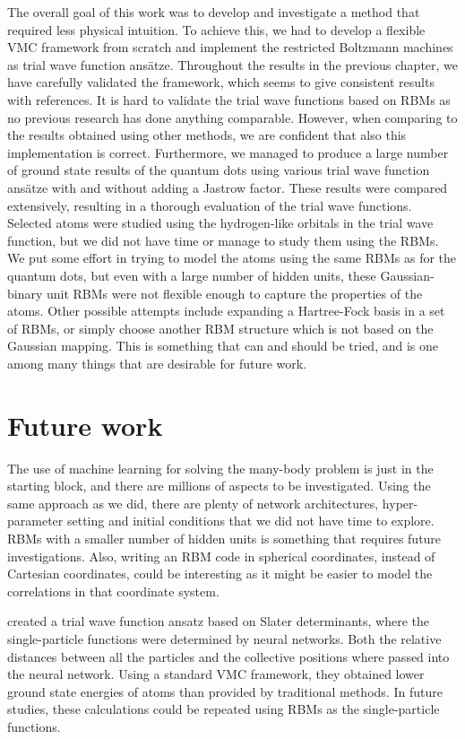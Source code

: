 The overall goal of this work was to develop and investigate a method that required less physical intuition. To achieve this, we had to develop a flexible VMC framework from scratch and implement the restricted Boltzmann machines as trial wave function ansätze. Throughout the results in the previous chapter, we have carefully validated the framework, which seems to give consistent results with references. It is hard to validate the trial wave functions based on RBMs as no previous research has done anything comparable. However, when comparing to the results obtained using other methods, we are confident that also this implementation is correct. Furthermore, we managed to produce a large number of ground state results of the quantum dots using various trial wave function ansätze with and without adding a Jastrow factor. These results were compared extensively, resulting in a thorough evaluation of the trial wave functions. Selected atoms were studied using the hydrogen-like orbitals in the trial wave function, but we did not have time or manage to study them using the RBMs. We put some effort in trying to model the atoms using the same RBMs as for the quantum dots, but even with a large number of hidden units, these Gaussian-binary unit RBMs were not flexible enough to capture the properties of the atoms. Other possible attempts include expanding a Hartree-Fock basis in a set of RBMs, or simply choose another RBM structure which is not based on the Gaussian mapping. This is something that can and should be tried, and is one among many things that are desirable for future work.

\section*{Future work}
The use of machine learning for solving the many-body problem is just in the starting block, and there are millions of aspects to be investigated. Using the same approach as we did, there are plenty of network architectures, hyper-parameter setting and initial conditions that we did not have time to explore. RBMs with a smaller number of hidden units is something that requires future investigations. Also, writing an RBM code in spherical coordinates, instead of Cartesian coordinates, could be interesting as it might be easier to model the correlations in that coordinate system.

\citet{pfau2019abinitio} created a trial wave function ansatz based on Slater determinants, where the single-particle functions were determined by neural networks. Both the relative distances between all the particles and the collective positions where passed into the neural network. Using a standard VMC framework, they obtained lower ground state energies of atoms than provided by traditional methods. In future studies, these calculations could be repeated using RBMs as the single-particle functions.

